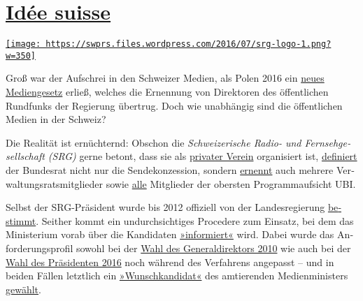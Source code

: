 \hypertarget{iduxe9e-suisse}{%
\section{\texorpdfstring{\href{https://swprs.org/2017/03/01/srg-idee-suisse/}{Idée
suisse}}{Idée suisse}}\label{iduxe9e-suisse}}

\href{https://swprs.org/2017/03/01/srg-idee-suisse/}{\texttt{[image: https://swprs.files.wordpress.com/2016/07/srg-logo-1.png?w=350]}}

Groß war der Auf­schrei in den Schweizer Medien, als Polen 2016 ein
\href{http://www.nzz.ch/international/europa/wie-medien-zu-nationalen-kulturinstituten-werden-1.18670792}{neues
Medien­ge­setz} erließ, welches die Er­nennung von Di­rek­toren des
öffent­lichen Rundfunks der Regierung übertrug. Doch wie un­ab­hängig
sind die öffentlichen Medien in der Schweiz?

Die Realität ist er­nüch­ternd: Obschon die \emph{Schwei­ze­rische
Radio- und Fern­seh­ge­sell­schaft (SRG)} gerne betont, dass sie als
\href{https://web.archive.org/web/20190412225655/https://www.srginsider.ch/service-public/2013/10/30/warum-ist-der-ausdruck-staatsfernsehen-oder-oeffentlich-rechtlicher-sender-falsch/}{privater
Verein} orga­ni­siert ist,
\href{https://www.srgd.ch/de/aktuelles/news/2016/11/04/srg-konzession-weiterhin-den-handen-des-bundesrats/}{definiert}
der Bundesrat nicht nur die Sendekonzession, sondern
\href{http://www.srgssr.ch/de/srg/organe/verwaltungsrat/}{ernennt} auch
meh­rere Ver­wal­tungs­rats­mit­glieder sowie
\href{https://www.ubi.admin.ch/}{alle} Mit­glieder der obersten
Pro­gramm­auf­sicht UBI.

Selbst der SRG-Präsi­dent wurde bis 2012 offiziell von der
Landesregierung
\href{https://web.archive.org/web/20150919041519/http://www.srgssr.ch/fileadmin/pdfs/Vereinsgeschichte_SRG.pdf}{be­stimmt}.
Seit­her kommt ein un­durch­sich­tiges Pro­ce­dere zum Ein­satz, bei dem
das Minis­terium vorab über die Kan­di­daten
\href{http://www.tagesanzeiger.ch/schweiz/standard/Neuer-SRGPraesident-verzweifelt-gesucht/story/18371394}{»infor­miert«}
wird. Dabei wurde das An­for­de­rungs­profil sowohl bei der
\href{http://www.aargauerzeitung.ch/schweiz/srg-extrawurst-fuer-roger-de-weck-8808607}{Wahl
des General­di­rektors 2010} wie auch bei der
\href{http://www.nzz.ch/nzzas/nzz-am-sonntag/favorit-fuer-das-srg-praesidium-leuthard-will-cvp-freund-an-srg-spitze-ld.90097}{Wahl
des Prä­si­denten 2016} noch während des Ver­fahrens ange­passt -- und
in beiden Fällen letzt­lich ein
\href{http://www.aargauerzeitung.ch/schweiz/war-roger-de-weck-der-lieblingskandidat-von-moritz-leuenberger-8833796}{»Wunsch­kan­di­dat«}
des am­tie­renden Medien­mi­nis­ters
\href{http://www.nzz.ch/nzzas/nzz-am-sonntag/favorit-fuer-das-srg-praesidium-leuthard-will-cvp-freund-an-srg-spitze-ld.90097}{gewählt}.

